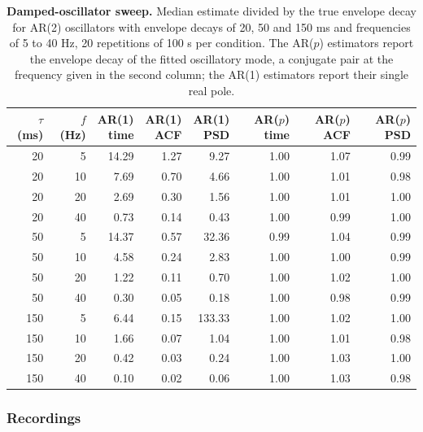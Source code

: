 \documentclass[pdflatex,sn-mathphys-num]{sn-jnl}
\begin{document}
\begin{table}[h]
\caption{\textbf{Damped-oscillator sweep.} Median estimate divided by the true envelope decay for AR(2) oscillators with envelope decays of 20, 50 and 150 ms and frequencies of 5 to 40 Hz, 20 repetitions of 100 s per condition. The AR($p$) estimators report the envelope decay of the fitted oscillatory mode, a conjugate pair at the frequency given in the second column; the AR(1) estimators report their single real pole.}\label{tab:s_damped}
\setlength{\tabcolsep}{3pt}
\begin{tabular}{rrrrrrrr}
\toprule
\shortstack[c]{$\tau$ \\ (ms)} & \shortstack[c]{$f$ \\ (Hz)} & \shortstack[c]{AR(1) \\ time} & \shortstack[c]{AR(1) \\ ACF} & \shortstack[c]{AR(1) \\ PSD} & \shortstack[c]{AR($p$) \\ time} & \shortstack[c]{AR($p$) \\ ACF} & \shortstack[c]{AR($p$) \\ PSD} \\
\midrule
20 & 5 & 14.29 & 1.27 & 9.27 & 1.00 & 1.07 & 0.99 \\
20 & 10 & 7.69 & 0.70 & 4.66 & 1.00 & 1.01 & 0.98 \\
20 & 20 & 2.69 & 0.30 & 1.56 & 1.00 & 1.01 & 1.00 \\
20 & 40 & 0.73 & 0.14 & 0.43 & 1.00 & 0.99 & 1.00 \\
50 & 5 & 14.37 & 0.57 & 32.36 & 0.99 & 1.04 & 0.99 \\
50 & 10 & 4.58 & 0.24 & 2.83 & 1.00 & 1.00 & 0.99 \\
50 & 20 & 1.22 & 0.11 & 0.70 & 1.00 & 1.02 & 1.00 \\
50 & 40 & 0.30 & 0.05 & 0.18 & 1.00 & 0.98 & 0.99 \\
150 & 5 & 6.44 & 0.15 & 133.33 & 1.00 & 1.02 & 1.00 \\
150 & 10 & 1.66 & 0.07 & 1.04 & 1.00 & 1.01 & 0.98 \\
150 & 20 & 0.42 & 0.03 & 0.24 & 1.00 & 1.03 & 1.00 \\
150 & 40 & 0.10 & 0.02 & 0.06 & 1.00 & 1.03 & 0.98 \\
\bottomrule
\end{tabular}
\end{table}

\subsubsection*{Recordings}
\end{document}

